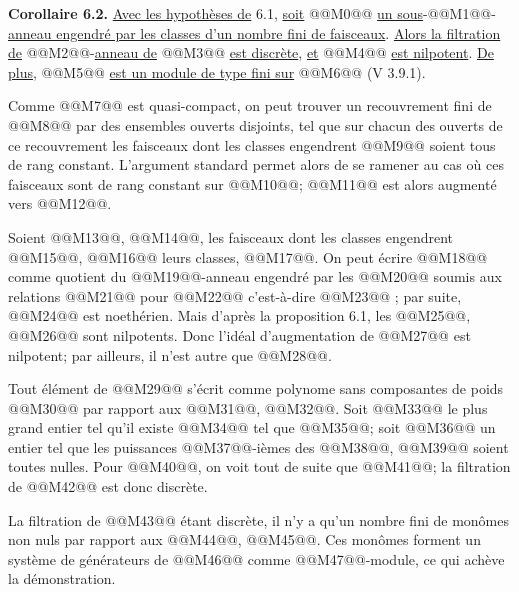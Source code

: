 
\textbf{Corollaire 6.2.} \uline{Avec les hypothèses de} 6.1, \uline{soit} @@M0@@ \uline{un sous}-@@M1@@-\uline{anneau engendré par les classes d'un nombre fini de faisceaux}. \uline{Alors la filtration de} @@M2@@-\uline{anneau de} @@M3@@ \uline{est discrète}, \uline{et} @@M4@@ \uline{est nilpotent}. \uline{De plus}, @@M5@@ \uline{est un module de type fini sur} @@M6@@ (V 3.9.1).

Comme @@M7@@ est quasi-compact, on peut trouver un recouvrement fini de @@M8@@ par des ensembles ouverts disjoints, tel que sur chacun des ouverts de ce recouvrement les faisceaux dont les classes engendrent @@M9@@ soient tous de rang constant. L'argument standard permet alors de se ramener au cas où ces faisceaux sont de rang constant sur @@M10@@; @@M11@@ est alors augmenté vers @@M12@@.

Soient @@M13@@, @@M14@@, les faisceaux dont les classes engendrent @@M15@@, @@M16@@ leurs classes, @@M17@@. On peut écrire @@M18@@ comme quotient du @@M19@@-anneau engendré par les @@M20@@ soumis aux relations @@M21@@ pour @@M22@@ c'est-à-dire @@M23@@ ; par suite, @@M24@@ est noethérien. Mais d'après la proposition 6.1, les @@M25@@, @@M26@@ sont nilpotents. Donc l'idéal d'augmentation de @@M27@@ est nilpotent; par ailleurs, il n'est autre que @@M28@@.

Tout élément de @@M29@@ s'écrit comme polynome sans composantes de poids @@M30@@ par rapport aux @@M31@@, @@M32@@. Soit @@M33@@ le plus grand entier tel qu'il existe @@M34@@ tel que @@M35@@; soit @@M36@@ un entier tel que les puissances @@M37@@-ièmes des @@M38@@, @@M39@@ soient toutes nulles. Pour @@M40@@, on voit tout de suite que @@M41@@; la filtration de @@M42@@ est donc discrète.

La filtration de @@M43@@ étant discrète, il n'y a qu'un nombre fini de monômes non nuls par rapport aux @@M44@@, @@M45@@. Ces monômes forment un système de générateurs de @@M46@@ comme @@M47@@-module, ce qui achève la démonstration.

